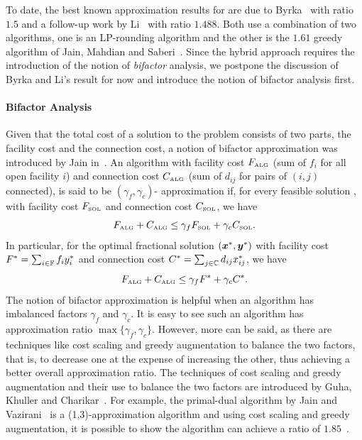 \documentclass[oneside,final]{ucr}
\begin{document}
To date, the best known approximation results for {\UFL} are
due to Byrka~\cite{Byrka07} with ratio $1.5$ and a follow-up
work by Li~\cite{Li11} with ratio $1.488$. Both use a
combination of two algorithms, one is an LP-rounding
algorithm and the other is the $1.61$ greedy algorithm of
Jain, Mahdian and Saberi~\cite{JainMS02}. Since the hybrid
approach requires the introduction of the notion of
\emph{bifactor} analysis, we postpone the discussion of
Byrka and Li's result for now and introduce the notion of
bifactor analysis first.

\paragraph{Bifactor Analysis}
Given that the total cost of a solution to the {\UFL}
problem consists of two parts, the facility cost and the
connection cost, a notion of bifactor approximation was
introduced by Jain {\etal} in~\cite{JainMMSV03}. An
algorithm with facility cost $F_{\mbox{\tiny\rm ALG}}$ (sum of $f_i$
for all open facility $i$) and connection cost
$C_{\mbox{\tiny\rm ALG}}$ (sum of $d_{ij}$ for pairs of $(i,j)$
connected), is said to be $(\gamma_f,\gamma_c)$-
approximation if, for every feasible solution {\SOL}, with
facility cost $F_{{{\mbox{\tiny\rm SOL}}}}$ and connection cost
$C_{{{\mbox{\tiny\rm SOL}}}}$, we have
\begin{equation*}
  F_{\mbox{\tiny\rm ALG}} + C_{\mbox{\tiny\rm ALG}} \leq \gamma_f F_{{{\mbox{\tiny\rm SOL}}}} +
  \gamma_c C_{{{\mbox{\tiny\rm SOL}}}}.
\end{equation*}
In particular, for the optimal fractional solution
$(\boldsymbol{x}^\ast,\boldsymbol{y}^\ast)$ with facility cost $F^\ast =
\sum_{i\in\mathbb{F}} f_i y_i^\ast$ and connection cost
$C^\ast = \sum_{j\in\mathbb{C}} d_{ij} x_{ij}^\ast$, we have
\begin{equation*}
  F_{\mbox{\tiny\rm ALG}} + C_{\mbox{\tiny\rm ALG}} \leq \gamma_f F^\ast +
  \gamma_c C^\ast.
\end{equation*}
The notion of bifactor approximation is helpful when an
algorithm has imbalanced factors $\gamma_f$ and
$\gamma_c$. It is easy to see such an algorithm has
approximation ratio $\max\{\gamma_f, \gamma_c\}$. However,
more can be said, as there are techniques like cost scaling
and greedy augmentation to balance the two factors, that is,
to decrease one at the expense of increasing the other, thus
achieving a better overall approximation ratio. The
techniques of cost scaling and greedy augmentation and their
use to balance the two factors are introduced by Guha,
Khuller and Charikar~\cite{GuhaK98, CharikarG05}. For
example, the primal-dual algorithm by Jain and
Vazirani~\cite{JainV03} is a (1,3)-approximation algorithm
and using cost scaling and greedy augmentation, it is
possible to show the algorithm can achieve a ratio of
$1.85$~\cite{CharikarG05}.
\end{document}
